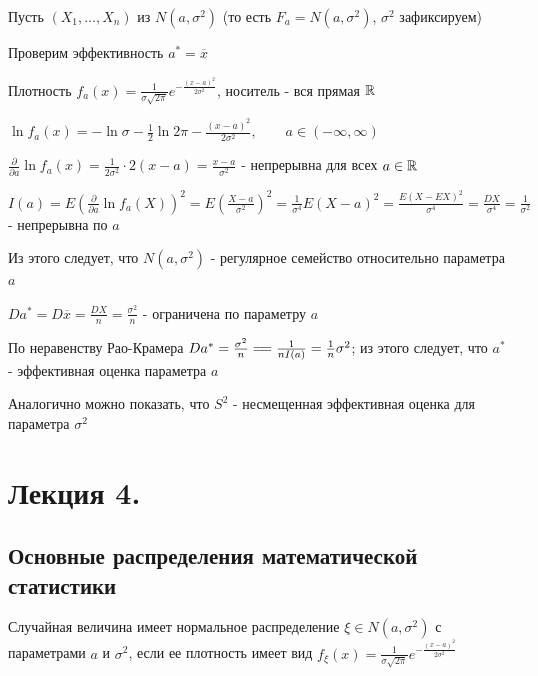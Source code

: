 \documentclass[12pt]{article}
\begin{document}
\Ex Пусть $(X_1, \dots, X_n)$ из $N(a, \sigma^2)$ (то есть $F_a = N(a, \sigma^2)$, $\sigma^2$ зафиксируем)

Проверим эффективность $a^* = \overline{x}$

Плотность $f_a(x) = \frac{1}{\sigma \sqrt{2\pi}} e^{-\frac{(x - a)^2}{2\sigma^2}}$, носитель - вся прямая $\mathbb{R}$

$\ln f_a(x) = -\ln \sigma - \frac{1}{2} \ln 2\pi - \frac{(x - a)^2}{2\sigma^2}, \quad\quad a \in (-\infty, \infty)$

$\frac{\partial}{\partial a} \ln f_a(x) = \frac{1}{2\sigma^2} \cdot 2(x - a) = \frac{x - a}{\sigma^2}$ - непрерывна для всех $a \in \mathbb{R}$

$I(a) = E\left(\frac{\partial}{\partial a} \ln f_a(X)\right)^2 = E\left(\frac{X - a}{\sigma^2}\right)^2 = \frac{1}{\sigma^4} E(X - a)^2 = \frac{E(X - EX)^2}{\sigma^4} = 
\frac{DX}{\sigma^4} = \frac{1}{\sigma^2}$ - непрерывна по $a$

Из этого следует, что $N(a, \sigma^2)$ - регулярное семейство относительно параметра $a$

$Da^* = D\overline{x} = \frac{DX}{n} = \frac{\sigma^2}{n}$ - ограничена по параметру $a$

По неравенству Рао-Крамера $Da^* = \frac{\sigma^2}{n} =\joinrel= \frac{1}{nI(a)} = \frac{1}{n} \sigma^2$; из 
этого следует, что $a^*$ - эффективная оценка параметра $a$

\Nota Аналогично можно показать, что $S^2$ - несмещенная эффективная оценка для параметра $\sigma^2$









\section{Лекция 4.}

\subsection{Основные распределения математической статистики}

\Def Случайная величина имеет нормальное распределение $\xi \in N(a, \sigma^2)$ с параметрами $a$ и $\sigma^2$, если
ее плотность имеет вид $f_\xi(x) = \frac{1}{\sigma\sqrt{2\pi}} e^{-\frac{(x - a)^2}{2\sigma^2}}$
\end{document}
